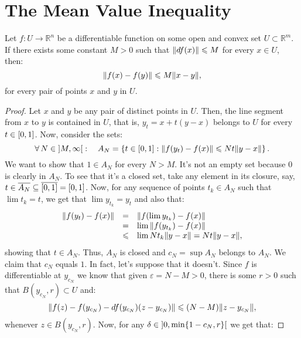 \section{The Mean Value Inequality}\label{sec:the_mean_value_inequality}

\begin{theorem}\label{thm:the-mean-value-inequality}
	Let \(f:{U}\to{\mathbb{R}^{n}}\) be a differentiable function on some open and
	convex set \({U}\subset{\mathbb{R}^{m}}\). If there exists some constant
	\(M>0\) such that \(\lVert df(x)\rVert\leqslant{M}\) for every \({x}\in{U}\), then:
	\[
		{\lVert f(x)-f(y)\rVert}\leqslant{M\lVert x-y\rVert},
	\]
	for every pair of points \(x\) and \(y\) in \(U\).
\end{theorem}

\begin{proof}
	Let \(x\) and \(y\) be any pair of distinct points in \(U\). Then, the line
	segment from \(x\) to \(y\) is contained in \(U\), that is,
	\(y_{t}=x+t(y-x)\) belongs to \(U\) for every \({t}\in{\interval{0}{1}}\).
	Now, consider the sets:
	\[
		\forall\,{N}\in{\ointerval{M}{\infty}}:\quad
		A_{N}
		=
		\left\{
		{t}\in{\interval{0}{1}}
		:
		{\norm{f(y_{t})-f(x)}}\leqslant{Nt\norm{y-x}}
		\right\}.
	\]
	We want to show that \({1}\in{A_{N}}\) for every \(N>M\). It's not an empty
	set because \(0\) is clearly in \(A_{N}\). To see that it's a closed set, take
	any element in its closure, say,
	\({t}\in{\overline{A_{N}}}\subseteq{\overline{\interval{0}{1}}}=\interval{0}{1}\).
	Now, for any sequence of points \({t_{k}}\in{A_{N}}\) such that
	\(\lim{t_{k}}=t\), we get that \(\lim{y_{t_{k}}}=y_{t}\) and also that:
	\[
		\begin{array}{rcl}
			\lVert f(y_{t})-f(x)\rVert
			 & =         &
			\lVert f(\lim{y_{t_{k}}})-f(x)\rVert
			\\
			 & =         &
			\lim{\lVert f(y_{t_{k}})-f(x)\rVert}
			\\
			 & \leqslant &
			\lim{Nt_{k}\lVert y-x\rVert}=Nt\lVert y-x\rVert,
		\end{array}
	\]
	showing that \({t}\in{A_{N}}\). Thus, \(A_{N}\) is closed and
	\(c_{N}=\sup{A_{N}}\) belongs to \(A_{N}\). We claim that \(c_{N}\) equals
	\(1\). In fact, let's suppose that it doesn't. Since \(f\) is differentiable
	at \(y_{c_{N}}\) we know that given \(\varepsilon=N-M>0\), there is some
	\(r>0\) such that \({B(y_{c_{N}},r)}\subset{U}\) and:
	\[
		\lVert f(z)-f(y_{c_{N}})-df(y_{c_{N}})(z-y_{c_{N}})\rVert
		\leqslant
		(N-M)\lVert z-y_{c_{N}}\rVert,
	\]
	whenever \({z}\in{B(y_{c_{N}},r)}\). Now, for any
	\({\delta}\in{\ointerval{0}{\min\{1-c_{N},r\}}}\) we get that:

\end{proof}
